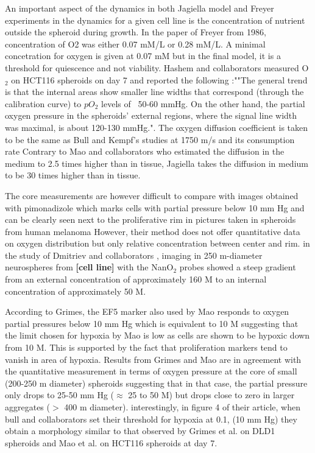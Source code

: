 \documentclass[11pt,a4paper]{article}
\begin{document}
An important aspect of the dynamics in both Jagiella model and Freyer experiments in the dynamics for a given cell line is the concentration of nutrient outside the spheroid during growth. In the paper of Freyer from 1986, concentration of O2 was either  0.07 mM/L or 0.28 mM/L. A minimal concetration for oxygen is given at 0.07 mM but in the final model, it is a threshold for quiescence and not viability. Hashem and collaborators measured O$_{2}$ on HCT116 spheroids on day 7 and reported the following :""The general trend is that the internal areas show smaller line widths that correspond (through the calibration curve) to $pO_2$ levels of ~50-60 mmHg. On the other hand, the partial oxygen pressure in the spheroids' external regions, where the signal line width was maximal, is about 120-130 mmHg."\cite{Hashem2015}. The oxygen diffusion coefficient is taken to be the same as Bull and Kempf's studies at 1750 \textmu m/s and its consumption rate Contrary to Mao and collaborators who estimated the diffusion in the medium to 2.5 times higher than in tissue, Jagiella takes the diffusion in medium to be 30 times higher than in tissue.  

The core measurements are however difficult to compare with images obtained with pimonadizole which marks cells with partial pressure below 10 mm Hg and can be clearly seen next to the proliferative rim in pictures taken in spheroids from human melanoma \cite{Raza2017} However, their method does not offer quantitative data on oxygen distribution but only relative concentration between center and rim. in the study of Dmitriev and collaborators , imaging in 250 \textmu m-diameter neurospheres from \textbf{[cell line]} with the NanO$_2$ probes showed a steep gradient from an external concentration of approximately 160 \textmu M to an internal concentration of approximately 50 \textmu M. 

According to Grimes, the EF5 marker also used by Mao responds to oxygen partial pressures below 10 mm Hg which is equivalent to 10 \textmu M suggesting that the limit chosen for hypoxia by Mao is low as cells are shown to be hypoxic down from 10 \textmu M. This is supported by the fact that proliferation markers tend to vanish in area of  hypoxia. Results from Grimes and Mao are in agreement with the quantitative measurement in terms of oxygen pressure at the core of small (200-250 \textmu m diameter) spheroids suggesting that in that case, the partial pressure only drops to 25-50 mm Hg ($\approx$ 25 to 50 \textmu M)  but drops close to zero in larger aggregates  ($>$ 400 \textmu m diameter). interestingly, in figure 4 of their article, when bull and collaborators set their threshold for hypoxia at 0.1, (10 mm Hg) they obtain a morphology similar to that observed by Grimes et al. on DLD1 spheroids and Mao et al. on HCT116 spheroids at day 7.
\end{document}
